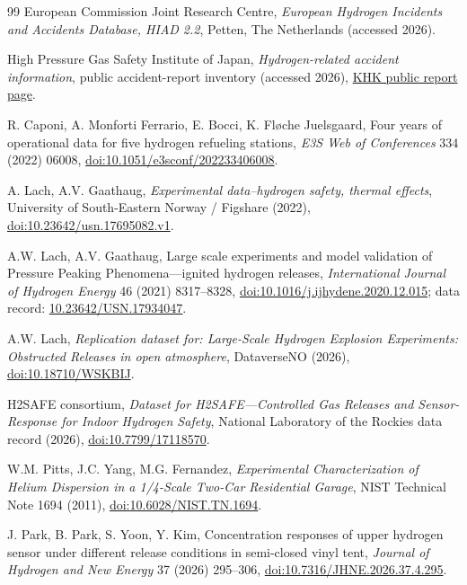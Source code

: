 \documentclass[12pt,a4paper]{article}
\begin{document}
\begin{thebibliography}{99}
European Commission Joint Research Centre, \textit{European Hydrogen Incidents
and Accidents Database, HIAD 2.2}, Petten, The Netherlands (accessed 2026).

High Pressure Gas Safety Institute of Japan, \textit{Hydrogen-related accident
information}, public accident-report inventory (accessed 2026),
\href{https://www.khk.or.jp/hydrogen/accident_information.html}{KHK public
report page}.

R. Caponi, A. Monforti Ferrario, E. Bocci, K. Fl\o che Juelsgaard, Four years
of operational data for five hydrogen refueling stations, \textit{E3S Web of
Conferences} 334 (2022) 06008,
\href{https://doi.org/10.1051/e3sconf/202233406008}{doi:10.1051/e3sconf/202233406008}.

A. Lach, A.V. Gaathaug, \textit{Experimental data--hydrogen safety, thermal
effects}, University of South-Eastern Norway / Figshare (2022),
\href{https://doi.org/10.23642/usn.17695082.v1}{doi:10.23642/usn.17695082.v1}.

A.W. Lach, A.V. Gaathaug, Large scale experiments and model validation of
Pressure Peaking Phenomena---ignited hydrogen releases, \textit{International
Journal of Hydrogen Energy} 46 (2021) 8317--8328,
\href{https://doi.org/10.1016/j.ijhydene.2020.12.015}{doi:10.1016/j.ijhydene.2020.12.015};
data record: \href{https://doi.org/10.23642/USN.17934047}{10.23642/USN.17934047}.

A.W. Lach, \textit{Replication dataset for: Large-Scale Hydrogen Explosion
Experiments: Obstructed Releases in open atmosphere}, DataverseNO (2026),
\href{https://doi.org/10.18710/WSKBIJ}{doi:10.18710/WSKBIJ}.

H2SAFE consortium, \textit{Dataset for H2SAFE---Controlled Gas Releases and
Sensor-Response for Indoor Hydrogen Safety}, National Laboratory of the Rockies
data record (2026), \href{https://doi.org/10.7799/17118570}{doi:10.7799/17118570}.

W.M. Pitts, J.C. Yang, M.G. Fernandez, \textit{Experimental Characterization
of Helium Dispersion in a 1/4-Scale Two-Car Residential Garage}, NIST Technical
Note 1694 (2011),
\href{https://doi.org/10.6028/NIST.TN.1694}{doi:10.6028/NIST.TN.1694}.

J. Park, B. Park, S. Yoon, Y. Kim, Concentration responses of upper hydrogen
sensor under different release conditions in semi-closed vinyl tent,
\textit{Journal of Hydrogen and New Energy} 37 (2026) 295--306,
\href{https://doi.org/10.7316/JHNE.2026.37.4.295}{doi:10.7316/JHNE.2026.37.4.295}.


\end{thebibliography}
\end{document}
